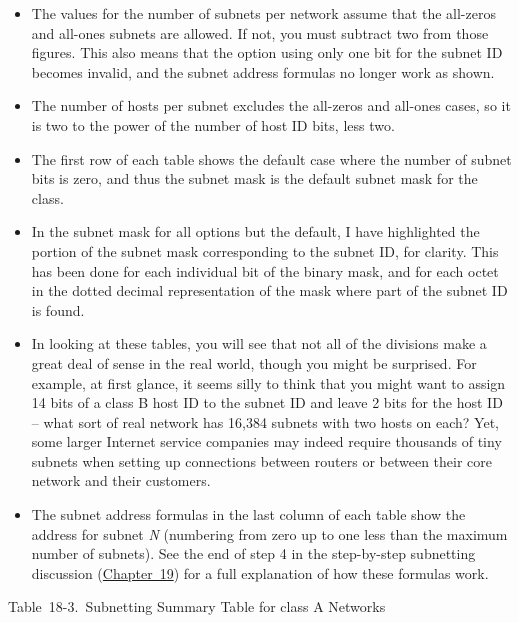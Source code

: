 \documentclass[b5paper,11pt]{memoir}
\begin{document}
\begin{itemize}
\item
  The values for the number of subnets per network assume that the
  all-zeros and all-ones subnets are allowed. If not, you must subtract
  two from those figures. This also means that the option using only one
  bit for the subnet ID becomes invalid, and the subnet address formulas
  no longer work as shown.
\item
  The number of hosts per subnet excludes the all-zeros and all-ones
  cases, so it is two to the power of the number of host ID bits, less
  two.
\item
  The first row of each table shows the default case where the number of
  subnet bits is zero, and thus the subnet mask is the default subnet
  mask for the class.
\item
  In the subnet mask for all options but the default, I have highlighted
  the portion of the subnet mask corresponding to the subnet ID, for
  clarity. This has been done for each individual bit of the binary
  mask, and for each octet in the dotted decimal representation of the
  mask where part of the subnet ID is found.
\item
  In looking at these tables, you will see that not all of the divisions
  make a great deal of sense in the real world, though you might be
  surprised. For example, at first glance, it seems silly to think that
  you might want to assign 14 bits of a class B host ID to the subnet ID
  and leave 2 bits for the host ID -- what sort of real network has
  16,384 subnets with two hosts on each? Yet, some larger Internet
  service companies may indeed require thousands of tiny subnets when
  setting up connections between routers or between their core network
  and their customers.
\item
  The subnet address formulas in the last column of each table show the
  address for subnet {\emph{N}} (numbering from zero up to one less than
  the maximum number of subnets). See the end of step 4 in the
  step-by-step subnetting discussion
  (\protect\hyperlink{ch19.html}{Chapter~19}) for a full explanation of
  how these formulas work.
\end{itemize}

\protect\hypertarget{ch18s07.htmlux5cux23subnetting_summary_table_for_class_a_net}{}{}

Table~18-3.~Subnetting Summary Table for class A Networks
\end{document}
